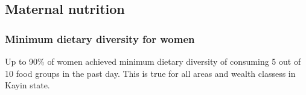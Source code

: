 \documentclass[12pt,a4paper]{article}
\begin{document}
\newpage

\hypertarget{maternal-nutrition}{%
\subsection{Maternal nutrition}\label{maternal-nutrition}}

\hypertarget{minimum-dietary-diversity-for-women}{%
\subsubsection{Minimum dietary diversity for women}\label{minimum-dietary-diversity-for-women}}

Up to 90\% of women achieved minimum dietary diversity of consuming 5 out of 10 food groups in the past day. This is true for all areas and wealth classess in Kayin state.
\end{document}
